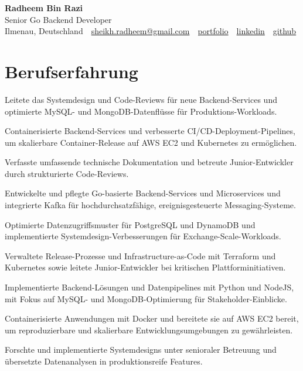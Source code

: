 \documentclass[11pt,a4paper]{resume}
\makeatletter
\newcommand{\Portfolio}{https://radheem.github.io/my-cv}
\newcommand{\PortfolioText}{portfolio}
\newcommand{\GitHub}{https://github.com/radheem}
\newcommand{\LinkedIn}{https://www.linkedin.com/in/radheem-razi}
\newcommand{\Email}{sheikh.radheem@gmail.com}
\makeatother
\begin{document}
\clearpage
{}

\begin{center}
  {\huge\bfseries Radheem Bin Razi}\\[3pt]
  {\large Senior Go Backend Developer}\\[6pt]
  \small
  Ilmenau, Deutschland \,\textbar\,
  \href{mailto:\Email}{\Email} \,\textbar\,
  \href{\Portfolio}{\PortfolioText} \,\textbar\,
  \href{\LinkedIn}{linkedin} \,\textbar\,
  \href{\GitHub}{github}
\end{center}
\vspace{2pt}

\section{Berufserfahrung}

\bullets
  \item Leitete das Systemdesign und Code-Reviews für neue Backend-Services und optimierte MySQL- und MongoDB-Datenflüsse für Produktions-Workloads.
  \item Containerisierte Backend-Services und verbesserte CI/CD-Deployment-Pipelines, um skalierbare Container-Release auf AWS EC2 und Kubernetes zu ermöglichen.
  \item Verfasste umfassende technische Dokumentation und betreute Junior-Entwickler durch strukturierte Code-Reviews.
\bulletsend
\vspace{3pt}
\bullets
  \item Entwickelte und pflegte Go-basierte Backend-Services und Microservices und integrierte Kafka für hochdurchsatzfähige, ereignisgesteuerte Messaging-Systeme.
  \item Optimierte Datenzugriffsmuster für PostgreSQL und DynamoDB und implementierte Systemdesign-Verbesserungen für Exchange-Scale-Workloads.
  \item Verwaltete Release-Prozesse und Infrastructure-as-Code mit Terraform und Kubernetes sowie leitete Junior-Entwickler bei kritischen Plattforminitiativen.
\bulletsend
\vspace{3pt}
\bullets
  \item Implementierte Backend-Lösungen und Datenpipelines mit Python und NodeJS, mit Fokus auf MySQL- und MongoDB-Optimierung für Stakeholder-Einblicke.
  \item Containerisierte Anwendungen mit Docker und bereitete sie auf AWS EC2 bereit, um reproduzierbare und skalierbare Entwicklungsumgebungen zu gewährleisten.
  \item Forschte und implementierte Systemdesigns unter senioraler Betreuung und übersetzte Datenanalysen in produktionsreife Features.
\bulletsend
\vspace{3pt}
\end{document}
